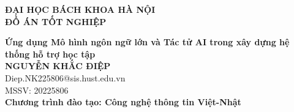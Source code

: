 \documentclass[DoAn.tex]{subfiles}
\begin{document}
\begin{titlepage}
\thispagestyle{empty}
\begin{center}

{\textbf{\large{ĐẠI HỌC BÁCH KHOA HÀ NỘI}}}\\[3cm]

{\textbf{\huge{ ĐỒ ÁN TỐT NGHIỆP}}}\\[1cm]
{\textbf{\Large{Ứng dụng Mô hình ngôn ngữ lớn và Tác tử AI trong xây dựng hệ thống hỗ trợ học tập	}}\\[1cm]

{\textbf{\large{NGUYỄN KHẮC ĐIỆP}}}\\
{\large{Diep.NK225806@sis.hust.edu.vn}}\\
{\large{MSSV: 20225806}}\\[0.5cm]

{\textbf{\large{Chương trình đào tạo: Công nghệ thông tin Việt-Nhật
}}}\\

\vspace{2.6cm}
\begin{table}[H]
\centering
{}
\end{table}}
\end{center}



\end{titlepage}
\end{document}
